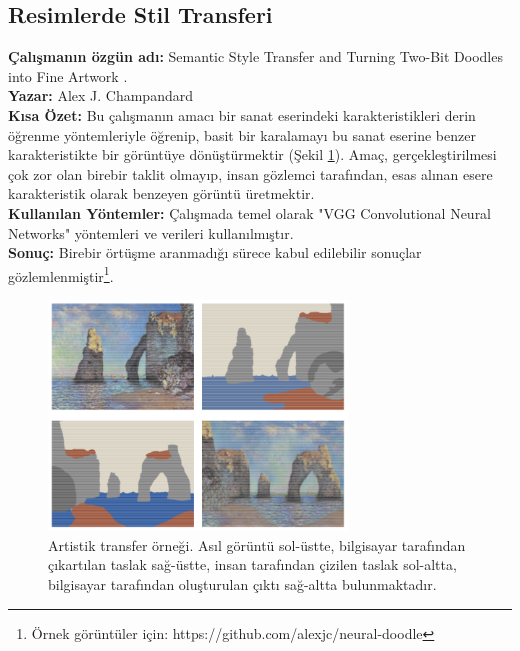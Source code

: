 \documentclass[12pt,a4paper]{article}
\renewcommand{\figurename}{Şekil}
\begin{document}
    \subsection{Resimlerde Stil Transferi}
    \textbf{Çalışmanın özgün adı:} Semantic Style Transfer and Turning Two-Bit Doodles into Fine Artwork \cite{trans}. \\
    \textbf{Yazar:} Alex J. Champandard \\
    \textbf{Kısa Özet:} Bu çalışmanın amacı bir sanat eserindeki karakteristikleri derin öğrenme yöntemleriyle
    öğrenip, basit bir karalamayı bu sanat eserine benzer karakteristikte bir görüntüye dönüştürmektir (\figurename{} \ref{fig:style}).
    Amaç, gerçekleştirilmesi çok zor olan birebir taklit olmayıp, insan gözlemci tarafından, esas alınan esere
    karakteristik olarak benzeyen görüntü üretmektir.\\
    \textbf{Kullanılan Yöntemler:} Çalışmada temel olarak "VGG Convolutional Neural Networks"\cite{vgg} yöntemleri ve
    verileri kullanılmıştır. \\
    \textbf{Sonuç:} Birebir örtüşme aranmadığı sürece kabul edilebilir sonuçlar gözlemlenmiştir\footnote{Örnek görüntüler için: https://github.com/alexjc/neural-doodle}.

    \begin{figure}
        \begin{center}
            \includegraphics[width=300px]{resimler/style.png}
            \caption{Artistik transfer örneği. Asıl görüntü sol-üstte, bilgisayar tarafından çıkartılan taslak sağ-üstte,
            insan tarafından çizilen taslak sol-altta, bilgisayar tarafından oluşturulan çıktı sağ-altta bulunmaktadır.\cite{trans}}
            \label{fig:style}
        \end{center}
    \end{figure}
\end{document}
